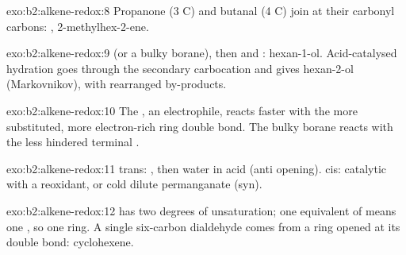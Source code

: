 \begin{solution}{exo:b2:alkene-redox:8}
Propanone (3 C) and butanal (4 C) join at their carbonyl carbons: ,
2-methylhex-2-ene.
\end{solution}

\begin{solution}{exo:b2:alkene-redox:9}
 (or a bulky borane), then  and : hexan-1-ol. Acid-catalysed hydration
goes through the secondary carbocation and gives hexan-2-ol (Markovnikov), with
rearranged by-products.
\end{solution}

\begin{solution}{exo:b2:alkene-redox:10}
The , an electrophile, reacts faster with the more substituted, more electron-rich
ring double bond. The bulky borane reacts with the less hindered terminal .
\end{solution}

\begin{solution}{exo:b2:alkene-redox:11}
trans: , then water in acid (anti opening). cis: catalytic  with a
reoxidant, or cold dilute permanganate (syn).
\end{solution}

\begin{solution}{exo:b2:alkene-redox:12}
 has two degrees of unsaturation; one equivalent of  means one , so
one ring. A single six-carbon dialdehyde comes from a ring opened at its double bond:
cyclohexene.
\end{solution}

